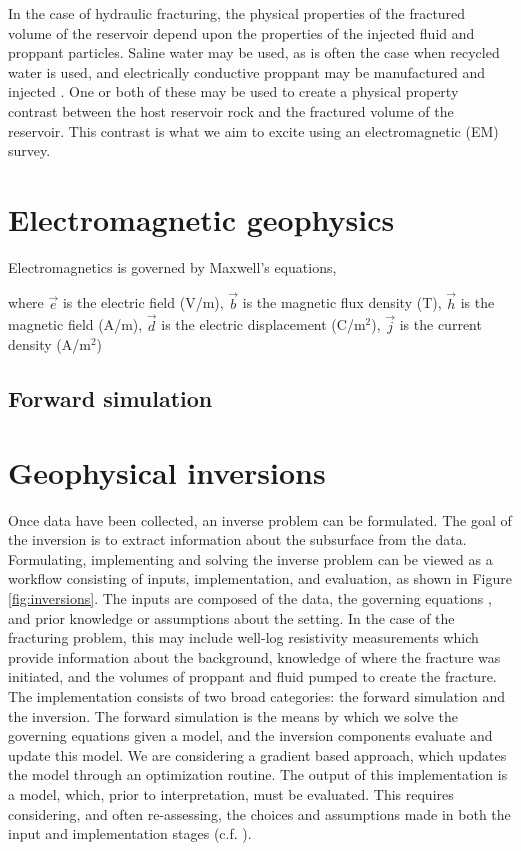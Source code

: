 In the case of hydraulic fracturing, the physical properties of the fractured volume of the reservoir depend upon the properties of the injected fluid and proppant particles. Saline water may be used, as is often the case when recycled water is used, and electrically conductive proppant may be manufactured and injected \citep{cannan2014electrically, Vengosh2014, King2010}. One or both of these may be used to create a physical property contrast between the host reservoir rock and the fractured volume of the reservoir. This contrast is what we aim to excite using an electromagnetic (EM) survey.


\section{Electromagnetic geophysics}

Electromagnetics is governed by Maxwell’s equations,


where $\vec{e}$ is the electric field (V/m), $\vec{b}$ is the magnetic flux density (T), $\vec{h}$ is the magnetic field (A/m), $\vec{d}$ is the electric displacement (C/m$^2$), $\vec{j}$ is the current density (A/m$^2$)


\subsection{Forward simulation}
\section{Geophysical inversions}

Once data have been collected, an inverse problem can be formulated. The goal of the inversion is to extract information about the subsurface from the data. Formulating, implementing and solving the inverse problem can be viewed as a workflow consisting of inputs, implementation, and evaluation, as shown in Figure \ref{fig:inversions}. The inputs are composed of the data, the governing equations , and prior knowledge or assumptions about the setting. In the case of the fracturing problem, this may include well-log resistivity measurements which provide information about the background, knowledge of where the fracture was initiated, and the volumes of proppant and fluid pumped to create the fracture.
The implementation consists of two broad categories: the forward simulation and the inversion. The forward simulation is the means by which we solve the governing equations given a model, and the inversion components evaluate and update this model. We are considering a gradient based approach, which updates the model through an optimization routine. The output of this implementation is a model, which, prior to interpretation, must be evaluated. This requires considering, and often re-assessing, the choices and assumptions made in both the input and implementation stages (c.f. \cite{Oldenburg2005, Haber2014a, Cockett2015}).

